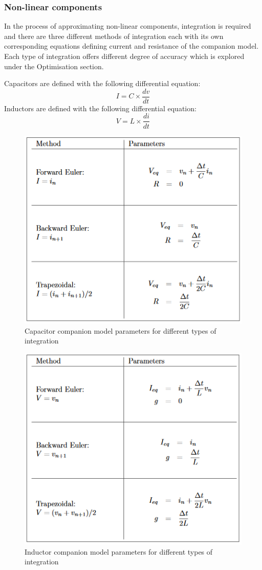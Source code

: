 \documentclass[12pt,a4paper]{article}
\begin{document}
	\subsubsection{Non-linear components}
	In the process of approximating non-linear components, integration is 
	required and there are three different 
	methods of integration each with its own corresponding equations defining 
	current and resistance of the companion model. Each type of integration offers different
	degree of accuracy which is explored under the Optimisation section.\par
	Capacitors are defined with the following differential equation:
	$$I=C\times \frac{dv}{dt}$$
	Inductors are defined with the following differential equation:
	$$V=L\times \frac{di}{dt}$$
	
	\begin{figure} 
		\centering
		\includegraphics[scale=0.90]{capacitor.PNG}
		\caption{\centering Capacitor companion model parameters for different types of integration 
		\cite{companion}}
	\end{figure} 
	\begin{figure} 
		\centering
		\includegraphics[scale=0.90]{inductor.PNG}
		\caption{\centering Inductor companion model parameters for different types of integration 
		\cite{companion}}
	\end{figure}
	\pagebreak
\end{document}
